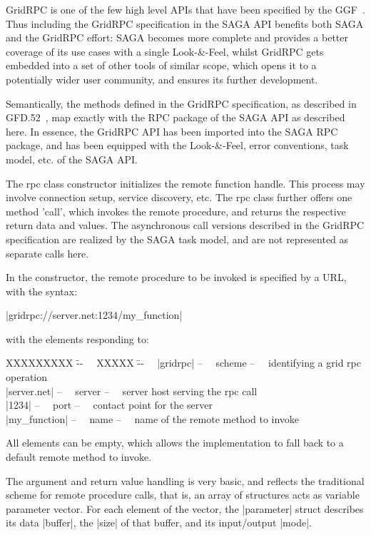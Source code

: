  
  GridRPC is one of the few high level APIs that have been
  specified by the GGF~\cite{gridrpc}.  Thus including the
  GridRPC specification in the SAGA API benefits both SAGA and
  the GridRPC effort: SAGA becomes more complete and provides a
  better coverage of its use cases with a single
  Look-\&-Feel, whilst GridRPC gets embedded into a set
  of other tools of similar scope, which opens it to a
  potentially wider user community, and ensures its further
  development.
 
  Semantically, the methods defined in the GridRPC
  specification, as described in GFD.52~\cite{gridrpc}, map
  exactly with the RPC package of the SAGA API as described
  here. In essence, the GridRPC API has been imported into the
  SAGA RPC package, and has been equipped with the
  Look-\&-Feel, error conventions, task model, etc.  of
  the SAGA API.
 
  The rpc class constructor initializes the remote function
  handle.  This process may involve connection setup, service
  discovery, etc.  The rpc class further offers one method
  'call', which invokes the remote procedure, and returns the
  respective return data and values.  The asynchronous call
  versions described in the GridRPC specification are realized
  by the SAGA task model, and are not represented as separate
  calls here.
  
  In the constructor, the remote procedure to be invoked is
  specified by a URL, with the syntax:
 
    \shift |gridrpc://server.net:1234/my_function|
 
  with the elements responding to:
 
  \begin{tabbing}
    \shift XXXXXXXXX     \= --~~ XXXXX  \= --~~ \kill
    \shift |gridrpc|     \> --~~ scheme \> --~~ identifying a grid rpc operation\\
    \shift |server.net|  \> --~~ server \> --~~ server host serving the rpc call\\
    \shift |1234|        \> --~~ port   \> --~~ contact point for the server\\
    \shift |my_function| \> --~~ name   \> --~~ name of the remote method to invoke\\
  \end{tabbing}
  
  All elements can be empty, which allows the implementation to
  fall back to a default remote method to invoke.
  
  The argument and return value handling is very basic, and
  reflects the traditional scheme for remote procedure calls,
  that is, an array of structures acts as variable parameter
  vector. For each element of the vector, the |parameter| struct
  describes its data |buffer|, the |size| of that buffer, and
  its input/output |mode|.
  
